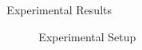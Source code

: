 \documentclass[final]{beamer}
\newlength{\sepwid}
\newlength{\onecolwid}
\begin{document}
\begin{frame}[t]
\begin{columns}[t]
\begin{column}{\onecolwid}
%
%


\end{column} %

\begin{column}{\sepwid}\end{column}

\begin{column}{\onecolwid} %


\begin{block}{Experimental Results}
\vskip -1cm
\begin{figure}
    \centering
    \caption{Experimental Setup}
    \label{fig:Setup}
\end{figure}


\end{block}
\end{column}
\end{columns}
\end{frame}
\end{document}
